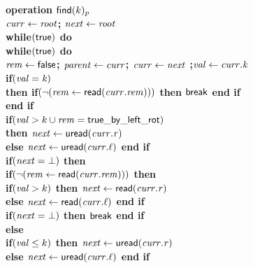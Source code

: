 \begin{figure}[h!]
{{\begin{minipage}[t]{150mm}
\begin{tabbing}
\bf{operation} $\act{find}(k)_p$ \\
		 \> $\ms{curr} \gets \ms{root}$; $\ms{next} \gets \ms{root}$ \\
		 \> \bf{while}$(\lit{true})$ \bf{do} \\
		 \>\> \bf{while}$(\lit{true})$ \bf{do} \\
		 \>\>\> $\ms{rem} \gets \lit{false}$; $\ms{parent} \gets \ms{curr}$; $\ms{curr} \gets \ms{next}$ ;$\ms{val} \gets \ms{curr.k}$ \\
		 \>\>\> \bf{if}$(\ms{val} = \ms{k})$ \label{line:eq-find} \\
		 \>\>\>\> \bf{then if}$(\neg(\ms{rem} \gets \lit{read}(\ms{curr.rem})))$ {\bf then} $\lit{break}$ \bf{end if} \label{line:break1} \label{line:rem-check1} \\
		 \>\>\> \bf{end if} \\
		 \>\>\> \bf{if}$(\ms{val} > k \cup \ms{rem} = \lit{true\_by\_left\_rot})$ \label{line:find-rot-check} \\
		 \>\>\>\> \bf{then} $\ms{next} \gets \lit{uread}(\ms{curr.r})$ \label{line:next-find1} \\
		 \>\>\>\> \bf{else} $\ms{next} \gets \lit{uread}(\ms{curr.\ell})$ {\bf end if} \label{line:next-find2} \\
		 \>\>\> \bf{if}$(\ms{next} = \bot)$ \bf{then} \\
		 \>\>\>\> \bf{if}$(\neg (\ms{rem} \gets \lit{read}(\ms{curr.rem})))$ \bf{then} \label{line:rem-check2} \\
		 \>\>\>\>\>\> \bf{if}$(\ms{val} > k)$ \bf{then} $\ms{next} \gets \lit{read}(\ms{curr.r})$ \label{line:null-par-find1} \\
		 \>\>\>\>\>\>\> \bf{else} $\ms{next} \gets \lit{read}(\ms{curr.\ell})$  \bf{end if} \label{line:null-par-find2} \\
		 \>\>\>\>\>\> \bf{if}$(\ms{next} = \bot)$ \bf{then} $\lit{break}$ \bf{end if}  \label{line:break2} \label{line:null-find} \\
		 \>\>\>\>\> \bf{else} \\
		 \>\>\>\>\>\> \bf{if}$(\ms{val} \leq k)$ \bf{then} $\ms{next} \gets \lit{uread}(\ms{curr.r})$ \label{line:rem-find1} \\
		 \>\>\>\>\>\>\> \bf{else} $\ms{next} \gets \lit{uread}(\ms{curr.\ell})$ \bf{end if} \label{line:rem-find2} \\

\end{tabbing}
\end{minipage}}}
\end{figure}
